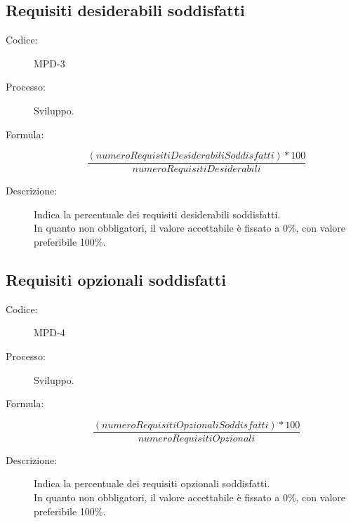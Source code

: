 \subsection{Requisiti desiderabili soddisfatti}
\begin{description}
    \item[Codice:] MPD-3
    \item[Processo:] Sviluppo.
    \item[Formula:]
    \begin{equation}
        \frac{(numeroRequisitiDesiderabiliSoddisfatti) * 100}{numeroRequisitiDesiderabili}
    \end{equation}
    \item[Descrizione:] Indica la percentuale dei requisiti desiderabili soddisfatti.\\ In quanto non obbligatori, il valore accettabile è fissato a 0\%, con valore preferibile 100\%.
\end{description}

\subsection{Requisiti opzionali soddisfatti}
\begin{description}
    \item[Codice:] MPD-4
    \item[Processo:] Sviluppo.
    \item[Formula:]
    \begin{equation}
        \frac{(numeroRequisitiOpzionaliSoddisfatti) * 100}{numeroRequisitiOpzionali}
    \end{equation}
    \item[Descrizione:] Indica la percentuale dei requisiti opzionali soddisfatti.\\ In quanto non obbligatori, il valore accettabile è fissato a 0\%, con valore preferibile 100\%.
\end{description}

